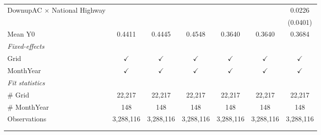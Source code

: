\begin{table}[htbp]
\begin{tabular}{lcccccc}
      DownupAC $\times$ National Highway                         &               &               &               &               &               & 0.0226\\   
                                                                 &               &               &               &               &               & (0.0401)\\   
      \hline Mean Y0                                             & 0.4411        & 0.4445        & 0.4548        & 0.3640        & 0.3640        & 0.3684\\  
      \midrule
      \emph{Fixed-effects}\\
      Grid                                                       & $\checkmark$  & $\checkmark$  & $\checkmark$  & $\checkmark$  & $\checkmark$  & $\checkmark$\\   
      MonthYear                                                  & $\checkmark$  & $\checkmark$  & $\checkmark$  & $\checkmark$  & $\checkmark$  & $\checkmark$\\   
      \midrule
      \emph{Fit statistics}\\
      \# Grid                                                    & 22,217        & 22,217        & 22,217        & 22,217        & 22,217        & 22,217\\  
      \# MonthYear                                               & 148           & 148           & 148           & 148           & 148           & 148\\  
      Observations                                               & 3,288,116     & 3,288,116     & 3,288,116     & 3,288,116     & 3,288,116     & 3,288,116\\  
      \midrule \midrule
                                                                 &               &               &               &               &               &  \tabularnewline 
      \\
   \end{tabular}
\end{table}


